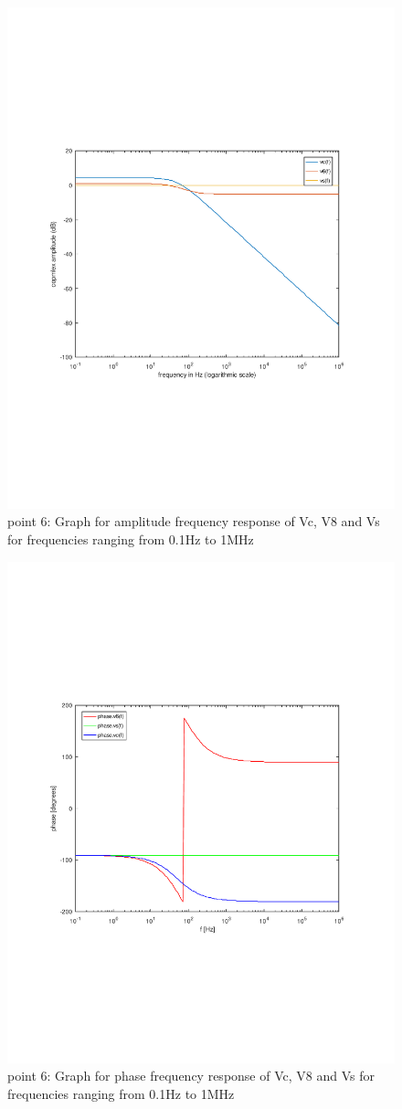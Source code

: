 \begin{figure}[h] \centering
\includegraphics[width=0.9\linewidth]{freq_resp_tab.pdf}
\caption{point 6: Graph for amplitude frequency response of Vc, V8 and Vs for frequencies ranging from 0.1Hz to 1MHz}
\label{fig:freq_resp}
\end{figure}

\begin{figure}[h] \centering
\includegraphics[width=0.9\linewidth]{angle_tab.pdf}
\caption{point 6: Graph for phase frequency response of Vc, V8 and Vs for frequencies ranging from 0.1Hz to 1MHz}
\label{fig:angle_resp}
\end{figure}





